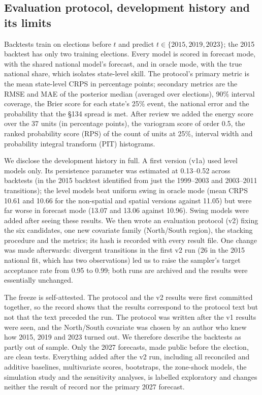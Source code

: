 \documentclass[preprint,12pt,authoryear]{elsarticle}
\begin{document}
\subsection{Evaluation protocol, development history and its limits}
\label{sec:protocol}
Backtests train on elections before $t$ and predict $t \in \{2015, 2019, 2023\}$; the 2015 backtest has only two training elections. Every model is scored in forecast mode, with the shared national model's forecast, and in oracle mode, with the true national share, which isolates state-level skill. The protocol's primary metric is the mean state-level CRPS in percentage points; secondary metrics are the RMSE and MAE of the posterior median (averaged over elections), 90\% interval coverage, the Brier score for each state's 25\% event, the national error and the probability that the \S134 spread is met. After review we added the energy score over the 37 units (in percentage points), the variogram score of order 0.5, the ranked probability score (RPS) of the count of units at 25\%, interval width and probability integral transform (PIT) histograms.

We disclose the development history in full. A first version (v1a) used level models only. Its persistence parameter was estimated at 0.13--0.52 across backtests (in the 2015 backtest identified from just the 1999--2003 and 2003--2011 transitions); the level models beat uniform swing in oracle mode (mean CRPS 10.61 and 10.66 for the non-spatial and spatial versions against 11.05) but were far worse in forecast mode (13.07 and 13.06 against 10.96). Swing models were added after seeing these results. We then wrote an evaluation protocol (v2) fixing the six candidates, one new covariate family (North/South region), the stacking procedure and the metrics; its hash is recorded with every result file. One change was made afterwards: divergent transitions in the first v2 run (26 in the 2015 national fit, which has two observations) led us to raise the sampler's target acceptance rate from 0.95 to 0.99; both runs are archived and the results were essentially unchanged.

The freeze is self-attested. The protocol and the v2 results were first committed together, so the record shows that the results correspond to the protocol text but not that the text preceded the run. The protocol was written after the v1 results were seen, and the North/South covariate was chosen by an author who knew how 2015, 2019 and 2023 turned out. We therefore describe the backtests as partly out of sample. Only the 2027 forecasts, made public before the election, are clean tests. Everything added after the v2 run, including all reconciled and additive baselines, multivariate scores, bootstraps, the zone-shock models, the simulation study and the sensitivity analyses, is labelled exploratory and changes neither the result of record nor the primary 2027 forecast.
\end{document}
